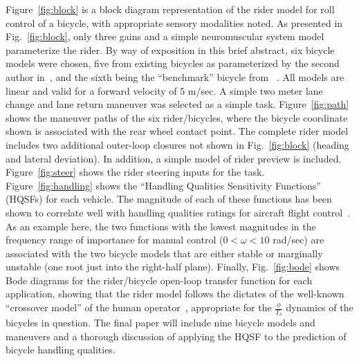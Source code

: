 \documentclass{bmd2010a}
\begin{document}
Figure~\ref{fig:block} is a block diagram representation of the
rider model for roll control of a bicycle, with appropriate sensory modalities
noted. As presented in Fig.~\ref{fig:block}, only three gains and a simple neuromuscular
system model parameterize the rider. By way of exposition in this brief
abstract, six bicycle models were chosen, five from existing bicycles as
parameterized by the second author in~\cite{Moore2010}, and the sixth being the ``benchmark'' bicycle from
~\cite{Meijaard2007}. All models are linear and valid for a forward velocity of 5 m/sec. A
simple two meter lane change and lane return maneuver was selected as a simple
task.
Figure~\ref{fig:path} shows the maneuver paths of the six rider/bicycles, where the bicycle
coordinate shown is associated with the rear wheel contact point. The complete
rider model includes two additional outer-loop closures not shown in
Fig.~\ref{fig:block} (heading and lateral deviation). In addition, a simple model of rider preview
is included. Figure~\ref{fig:steer} shows the rider steering inputs for the
task. Figure~\ref{fig:handling} shows the ``Handling Qualities Sensitivity
Functions'' (HQSFs) for each vehicle.
The magnitude of each of these functions has been shown to correlate well with
handling qualities ratings for aircraft flight control~\cite{Hess2006}. As an example here,
the two functions with the lowest magnitudes in the frequency range of
importance for manual control ($0<\omega<10$ rad/sec) are associated with the two
bicycle models that are either stable or marginally unstable (one root just
into the right-half plane). Finally, Fig.~\ref{fig:bode} shows Bode diagrams for the
rider/bicycle open-loop transfer function for each application, showing that
the rider model follows the dictates of the well-known ``crossover model'' of the
human operator~\cite{McRuer1974}, appropriate for the
$\frac{\phi}{T_\delta}$ dynamics of the
bicycles in question. The final paper will include nine bicycle models and
maneuvers and a thorough discussion of applying the HQSF to the prediction of
bicycle handling qualities.
\end{document}
